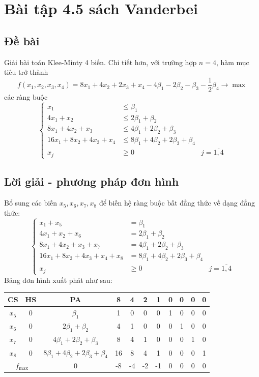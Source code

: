 \documentclass[12pt]{article}
\begin{document}
\section{Bài tập 4.5 sách Vanderbei}\label{Vanderbei-4.5}
\subsection{Đề bài}
Giải bài toán Klee-Minty 4 biến. Chi tiết hơn, với trường hợp $n = 4$, hàm mục tiêu trở thành
$$
f(x_1, x_2, x_3, x_4) = 8x_1 + 4x_2 + 2x_3 + x_4 - 4\beta_1 - 2\beta_2 - \beta_3 - \frac{1}{2}\beta_4 \rightarrow \max
$$
các ràng buộc
$$
\left\{
\begin{array}{lll}
x_1 &\leq \beta_1 \\
4x_1 + x_2 &\leq 2\beta_1 + \beta_2 \\
8x_1 + 4x_2 + x_3 &\leq 4\beta_1 + 2\beta_2 + \beta_3 \\
16x_1 + 8x_2 + 4x_3 + x_4 &\leq 8\beta_1 + 4\beta_2 + 2\beta_3 + \beta_4 \\
x_j &\geq 0\ &j = \overline{1, 4}
\end{array}
\right.
$$

\subsection{Lời giải - phương pháp đơn hình}
Bổ sung các biến $x_5, x_6, x_7, x_8$ để biến hệ ràng buộc bất đẳng thức về dạng đẳng thức:
$$
\left\{
\begin{array}{lll}
x_1 + x_5 &= \beta_1 \\
4x_1 + x_2 + x_6 &= 2\beta_1 + \beta_2 \\
8x_1 + 4x_2 + x_3 + x_7 &= 4\beta_1 + 2\beta_2 + \beta_3 \\
16x_1 + 8x_2 + 4x_3 + x_4 + x_8 &= 8\beta_1 + 4\beta_2 + 2\beta_3 + \beta_4 \\
x_j &\geq 0\ &j = \overline{1, 4}
\end{array}
\right.
$$
Bảng đơn hình xuất phát như sau:
\begin{table}[H]
\centering
\begin{tabular}{|c|c|c|c|c|c|c|c|c|c|c|}
\hline
CS & HS & PA & 8 & 4 & 2 & 1 & 0 & 0 & 0 & 0 \\
\hline
$x_5$ & 0 & $\beta_1$ & 1 & 0 & 0 & 0 & 1 & 0 & 0 & 0 \\
$x_6$ & 0 & $2\beta_1 + \beta_2$ & 4 & 1 & 0 & 0 & 0 & 1 & 0 & 0 \\
$x_7$ & 0 & $4\beta_1 + 2\beta_2 + \beta_3$ & 8 & 4 & 1 & 0 & 0 & 0 & 1 & 0 \\
$x_8$ & 0 & $8\beta_1 + 4\beta_2 + 2\beta_3 + \beta_4$ & 16 & 8 & 4 & 1 & 0 & 0 & 0 & 1 \\
\hline
\multicolumn{2}{|c|}{$f_{\max}$}
& 0 & -8 & -4 & -2 & -1 & 0 & 0 & 0 & 0 \\
\hline
\end{tabular}
\end{table}
\end{document}
